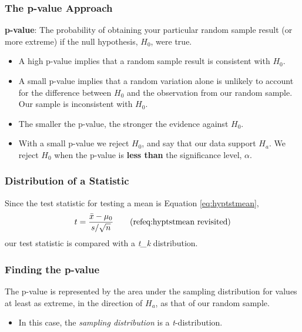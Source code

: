 \documentclass[
  openany]{book}
\providecommand{\tightlist}{%
  \setlength{\itemsep}{0pt}\setlength{\parskip}{0pt}}
\begin{document}
\subsubsection{The p-value Approach}\label{the-p-value-approach}

\textbf{p-value}: The probability of obtaining your particular random sample result (or more extreme) if the null hypothesis, \(H_0\), were true.

\begin{itemize}
\tightlist
\item
  A high p-value implies that a random sample result is consistent with \(H_0\).
\item
  A small p-value implies that a random variation alone is unlikely to account for the difference between \(H_0\) and the observation from our random sample. Our sample is inconsistent with \(H_0\).
\item
  The smaller the p-value, the stronger the evidence against \(H_0\).
\item
  With a small p-value we reject \(H_0\), and say that our data support \(H_a\). We reject \(H_0\) when the p-value is \textbf{less than} the significance level, \(\alpha\).
\end{itemize}

\subsubsection{Distribution of a Statistic}\label{distribution-of-a-statistic}

Since the test statistic for testing a mean is Equation \eqref{eq:hyptstmean}, \begin{equation}
t=\frac{\bar{x}-\mu_0}{s/\sqrt{n}} \tag{\@ref{eq:hyptstmean} revisited}
\end{equation} our test statistic is compared with a \emph{t\_k} distribution.

\subsubsection{Finding the p-value}\label{finding-the-p-value}

The p-value is represented by the area under the sampling distribution for values at least as extreme, in the direction of \(H_a\), as that of our random sample.

\begin{itemize}
\tightlist
\item
  In this case, the \emph{sampling distribution} is a \emph{t}-distribution.
\end{itemize}
\end{document}
